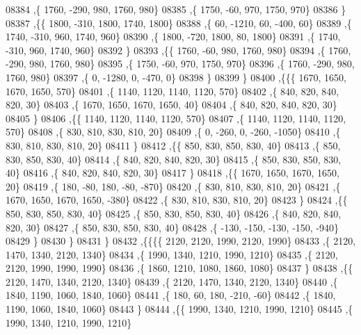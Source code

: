 \begin{DoxyCode}
08384     ,\{  1760,  -290,   980,  1760,   980\}
08385     ,\{  1750,   -60,   970,  1750,   970\}
08386     \}
08387    ,\{\{  1800,  -310,  1800,  1740,  1800\}
08388     ,\{    60, -1210,    60,  -400,    60\}
08389     ,\{  1740,  -310,   960,  1740,   960\}
08390     ,\{  1800,  -720,  1800,    80,  1800\}
08391     ,\{  1740,  -310,   960,  1740,   960\}
08392     \}
08393    ,\{\{  1760,   -60,   980,  1760,   980\}
08394     ,\{  1760,  -290,   980,  1760,   980\}
08395     ,\{  1750,   -60,   970,  1750,   970\}
08396     ,\{  1760,  -290,   980,  1760,   980\}
08397     ,\{     0, -1280,     0,  -470,     0\}
08398     \}
08399    \}
08400   ,\{\{\{  1670,  1650,  1670,  1650,   570\}
08401     ,\{  1140,  1120,  1140,  1120,   570\}
08402     ,\{   840,   820,   840,   820,    30\}
08403     ,\{  1670,  1650,  1670,  1650,    40\}
08404     ,\{   840,   820,   840,   820,    30\}
08405     \}
08406    ,\{\{  1140,  1120,  1140,  1120,   570\}
08407     ,\{  1140,  1120,  1140,  1120,   570\}
08408     ,\{   830,   810,   830,   810,    20\}
08409     ,\{     0,  -260,     0,  -260, -1050\}
08410     ,\{   830,   810,   830,   810,    20\}
08411     \}
08412    ,\{\{   850,   830,   850,   830,    40\}
08413     ,\{   850,   830,   850,   830,    40\}
08414     ,\{   840,   820,   840,   820,    30\}
08415     ,\{   850,   830,   850,   830,    40\}
08416     ,\{   840,   820,   840,   820,    30\}
08417     \}
08418    ,\{\{  1670,  1650,  1670,  1650,    20\}
08419     ,\{   180,   -80,   180,   -80,  -870\}
08420     ,\{   830,   810,   830,   810,    20\}
08421     ,\{  1670,  1650,  1670,  1650,  -380\}
08422     ,\{   830,   810,   830,   810,    20\}
08423     \}
08424    ,\{\{   850,   830,   850,   830,    40\}
08425     ,\{   850,   830,   850,   830,    40\}
08426     ,\{   840,   820,   840,   820,    30\}
08427     ,\{   850,   830,   850,   830,    40\}
08428     ,\{  -130,  -150,  -130,  -150,  -940\}
08429     \}
08430    \}
08431   \}
08432  ,\{\{\{\{  2120,  2120,  1990,  2120,  1990\}
08433     ,\{  2120,  1470,  1340,  2120,  1340\}
08434     ,\{  1990,  1340,  1210,  1990,  1210\}
08435     ,\{  2120,  2120,  1990,  1990,  1990\}
08436     ,\{  1860,  1210,  1080,  1860,  1080\}
08437     \}
08438    ,\{\{  2120,  1470,  1340,  2120,  1340\}
08439     ,\{  2120,  1470,  1340,  2120,  1340\}
08440     ,\{  1840,  1190,  1060,  1840,  1060\}
08441     ,\{   180,    60,   180,  -210,   -60\}
08442     ,\{  1840,  1190,  1060,  1840,  1060\}
08443     \}
08444    ,\{\{  1990,  1340,  1210,  1990,  1210\}
08445     ,\{  1990,  1340,  1210,  1990,  1210\}

\end{DoxyCode}
